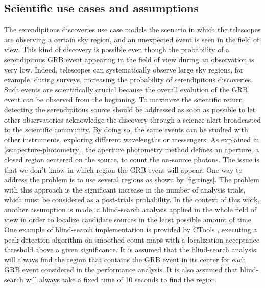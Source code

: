 \subsection{Scientific use cases and assumptions}
\label{ss:scientific-use-cases-and-assumptions}
The serendipitous discoveries use case models the scenario in which the telescopes are observing a certain sky region, and an unexpected event is seen in the field of view. This kind of discovery is possible even though the probability of a serendipitous GRB event appearing in the field of view during an observation is very low. Indeed, telescopes can systematically observe large sky regions, for example, during surveys, increasing the probability of serendipitous discoveries. Such events are scientifically crucial because the overall evolution of the GRB event can be observed from the beginning. To maximize the scientific return, detecting the serendipitous source should be addressed as soon as possible to let other observatories acknowledge the discovery through a science alert broadcasted to the scientific community. By doing so, the same events can be studied with other instruments, exploring different wavelengths or messengers. 
As explained in \autoref{ss:aperture-photometry}, the aperture photometry method defines an aperture, a closed region centered on the source, to count the on-source photons. The issue is that we don't know in which region the GRB event will appear. One way to address the problem is to use several regions as shown by \autoref{fig:rings}. The problem with this approach is the significant increase in the number of analysis trials, which must be considered as a post-trials probability. In the context of this work, another assumption is made, a blind-search analysis applied in the whole field of view in order to localize candidate sources in the least possible amount of time. One example of blind-search implementation is provided by CTools \cite{Knodlseder_2016}, executing a peak-detection algorithm on smoothed count maps with a localization acceptance threshold above a given significance. It is assumed that the blind-search analysis will always find the region that contains the GRB event in its center for each GRB event considered in the performance analysis. It is also assumed that blind-search will always take a fixed time of 10 seconds to find the region. 


